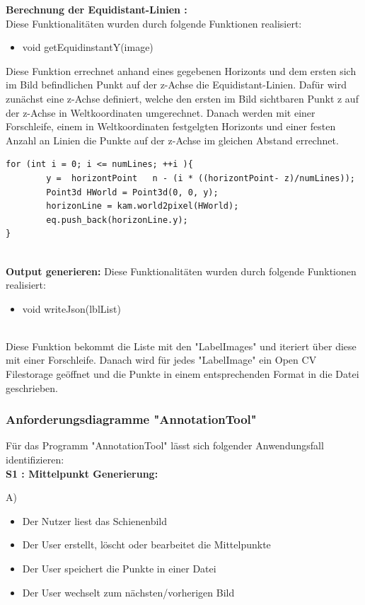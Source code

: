 \documentclass[11pt]{scrartcl}
\begin{document}
\noindent
\textbf{Berechnung der Equidistant-Linien :}
\\

\noindent
Diese Funktionalitäten wurden durch folgende Funktionen realisiert:
\begin{itemize}
	\item void getEquidinstantY(image)
\end{itemize}

\noindent
Diese Funktion errechnet anhand eines gegebenen Horizonts und dem ersten sich im Bild befindlichen Punkt auf der z-Achse die Equidistant-Linien. Dafür wird zunächst eine z-Achse definiert, welche den ersten im Bild sichtbaren Punkt z auf der z-Achse in Weltkoordinaten umgerechnet. Danach werden mit einer Forschleife,  einem in Weltkoordinaten festgelgten Horizonts und einer festen Anzahl an Linien die Punkte auf der z-Achse im gleichen Abstand errechnet.
\begin{lstlisting}
for (int i = 0; i <= numLines; ++i ){
        y =  horizontPoint   n - (i * ((horizontPoint- z)/numLines));
        Point3d HWorld = Point3d(0, 0, y);
        horizonLine = kam.world2pixel(HWorld);
        eq.push_back(horizonLine.y);
}
\end{lstlisting}

\noindent
\\
\textbf{Output generieren:}
\noindent
Diese Funktionalitäten wurden durch folgende Funktionen realisiert:
\begin{itemize}
	\item void writeJson(lblList)
\end{itemize}
\noindent
\\
Diese Funktion bekommt die Liste mit den "LabelImages" und iteriert über diese mit einer Forschleife. Danach wird für jedes "LabelImage" ein Open CV Filestorage geöffnet und die Punkte in einem entsprechenden Format in die Datei geschrieben.

\subsubsection{Anforderungsdiagramme "AnnotationTool"}
\label{sec:Anforderungsdiagramme "AnnotationTool"}

Für das Programm "AnnotationTool" lässt sich folgender Anwendungsfall identifizieren:
\\

\noindent
\textbf{S1 : Mittelpunkt Generierung:} 
	
\noindent
A)
\begin{itemize}
	\item Der Nutzer liest das Schienenbild
	\item Der User erstellt, löscht oder bearbeitet die Mittelpunkte
	\item Der User speichert die Punkte in einer Datei
	\item Der User wechselt zum nächsten/vorherigen Bild
\end{itemize}
\end{document}
